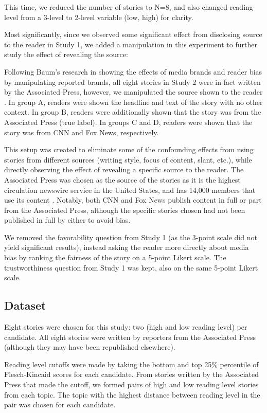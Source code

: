 This time, we reduced the number of stories to N=8, and also changed reading level from a 3-level to 2-level variable (low, high) for clarity.

Most significantly, since we observed some significant effect from disclosing source to the reader in Study 1, we added a manipulation in this experiment to further study the effect of revealing the source:

Following Baum's research in showing the effects of media brands and reader bias by manipulating reported brands, all eight stories in Study 2 were in fact written by the Associated Press, however, we manipulated the source shown to the reader \cite{baum2008eye}. In group A, readers were shown the headline and text of the story with no other context. In group B, readers were additionally shown that the story was from the Associated Press (true label). In groups C and D, readers were shown that the story was from CNN and Fox News, respectively.

This setup was created to eliminate some of the confounding effects from using stories from different sources (writing style, focus of content, slant, etc.), while directly observing the effect of revealing a specific source to the reader. The Associated Press was chosen as the source of the stories as it is the highest circulation newswire service in the United States, and has 14,000 members that use its content \cite{apFAQ}. Notably, both CNN and Fox News publish content in full or part from the Associated Press, although the specific stories chosen had not been published in full by either to avoid bias.

We removed the favorability question from Study 1 (as the 3-point scale did not yield significant results), instead asking the reader more directly about media bias by ranking the fairness of the story on a 5-point Likert scale. The trustworthiness question from Study 1 was kept, also on the same 5-point Likert scale.


\subsection{Dataset} 
Eight stories were chosen for this study: two (high and low reading level) per candidate. All eight stories were written by reporters from the Associated Press (although they may have been republished elsewhere).

Reading level cutoffs were made by taking the bottom and top 25\% percentile of Flesch-Kincaid scores for each candidate. From stories written by the Associated Press that made the cutoff, we formed pairs of high and low reading level stories from each topic. The topic with the highest distance between reading level in the pair was chosen for each candidate.

